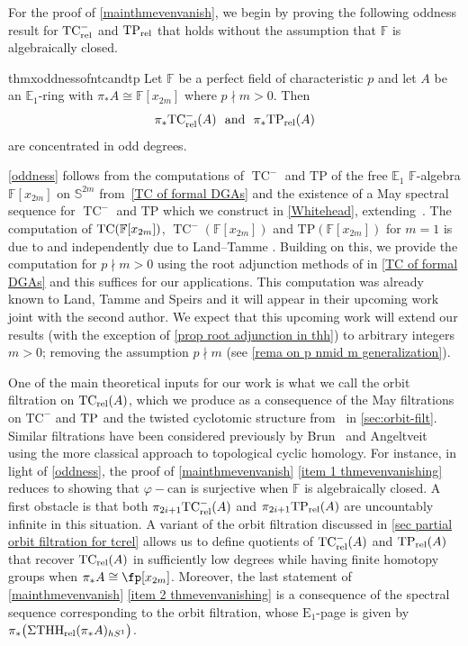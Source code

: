 \documentclass[english,10pt]{amsart}
\newcommand{\sph}{\mathbb{S}}
\newcommand{\rel}{\textup{rel}}
\newcommand{\field}{\mathbb{F}}
\theoremstyle{definition}
\numberwithin{equation}{section}
\DeclareMathOperator{\TC}{TC}
\newcommand{\ntc}{\mathrm{TC}^{-}}
\DeclareMathOperator{\tp}{\ensuremath{\textup{TP}}}
\DeclareMathOperator{\tc}{\ensuremath{\textup{TC}}}
\newcommand{\rntc}{\mathrm{TC}_{\rel}^{-}}
\newcommand{\rtp}{\mathrm{TP}_{\rel}}
\newcommand{\rtc}{\mathrm{TC}_{\rel}}
\newcommand{\rthh}{\mathrm{THH}_{\rel}}
\newcommand{\TP}{\mathrm{TP}}
\newcommand{\pis}{\pi_*}
\begin{document}
For the proof of \autoref{mainthmevenvanish}, we begin by proving the following oddness result for $\rntc$ and $\rtp$ that holds without the assumption that $\field$ is algebraically closed.

\begin{restatable}[Even vanishing of relative $\ntc$ and $\tp$]{thmx}{oddnessofntcandtp}\label{oddness}
Let $\field$ be a perfect field of characteristic $p$ and let $A$ be an $\mathbb{E}_1$-ring with  $\pis A \cong \mathbb{F}[x_{2m}]$ where $p\nmid m>0$. Then  \[\pis \rntc(A) \textup{\ \ and\  \ } \pis \rtp(A)\] 
are concentrated in odd degrees.
\end{restatable}



\autoref{oddness} follows from 
the computations of $\TC^{-}$ and $\TP$ of the free $\mathbb{E}_1$ $\field$-algebra $\mathbb{F}[x_{2m}]$ on $\sph^{2m}$  from~\autoref{TC of formal DGAs} and 
the existence of a May spectral sequence for $\TC^{-}$ and $\TP$ which we construct in \autoref{Whitehead}, extending~\cite{AKS18,Kee25}. 
The computation of $\tc(\field[x_{2m}])$, $\TC^{-}(\field[x_{2m}])$ and $\TP(\field[x_{2m}])$ for $m=1$ is due to \cite{bayindir2020kthryofthh} and independently due to Land--Tamme \cite{land2023kthrypushouts}. 
Building on this, we provide the computation for $p\nmid m>0$ using the root adjunction  methods of \cite{ausoni2022adjroot}  in \autoref{TC of formal DGAs} and this suffices for our applications. This computation was already known to Land, Tamme and Speirs  and it will appear in their upcoming work joint with the second author.
We expect that this upcoming work will extend our results (with the exception of \autoref{prop root adjunction in thh}) to arbitrary integers $m>0$; removing the assumption $p \nmid m$ (see \autoref{rema on p nmid m generalization}).

One of the main theoretical inputs for our work is what we call the orbit filtration on $\rtc(A)$, which we produce as a consequence of the May filtrations on $\ntc$ and $\tp$ and the twisted cyclotomic structure from~\cite{antieau2020beilinson} in \autoref{sec:orbit-filt}. Similar filtrations have been considered previously by Brun~\cite{Bru01} and Angeltveit~\cite{Angeltveit2015kTheoryfinitewitt} using the more classical approach to topological cyclic homology. 
For instance, in light of \autoref{oddness}, the proof of \autoref{mainthmevenvanish} \eqref{item 1 thmevenvanishing} reduces to showing that $\varphi -\mathrm{can}$ is surjective when $\field$ is algebraically closed. 
A first obstacle is that both $\pi_{2i+1} \rntc(A)$ and $\pi_{2i+1} \rtp(A)$ are uncountably infinite in this situation.  A variant of the orbit filtration discussed in \autoref{sec partial orbit filtration for tcrel} allows us to define quotients of $\rntc(A)$ and $\rtp(A)$ that recover $\rtc(A)$ in sufficiently low degrees while having finite homotopy groups when $\pis A \cong \fp[x_{2m}]$. Moreover, the last statement of \autoref{mainthmevenvanish} \eqref{item 2 thmevenvanishing} is a consequence of the spectral sequence corresponding to the orbit filtration, whose $\mathrm{E}_1$-page is given by $\pis \big(\Sigma \rthh(\pis A)_{hS^1}\big)$. 
\end{document}
